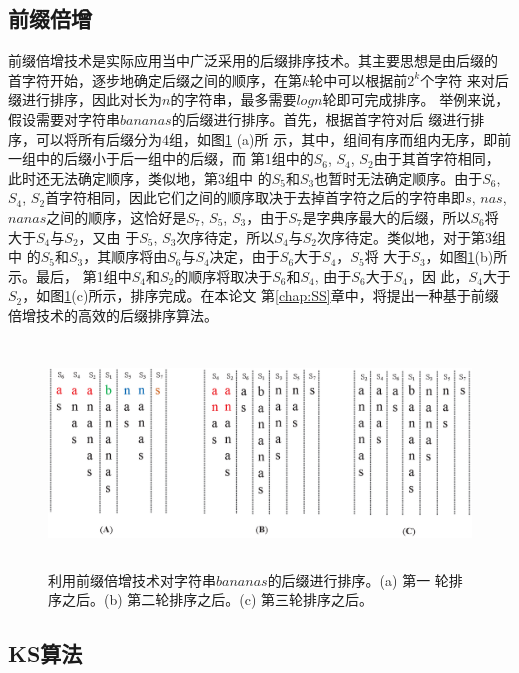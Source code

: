 \subsection{前缀倍增}

前缀倍增技术是实际应用当中广泛采用的后缀排序技术。其主要思想是由后缀的
首字符开始，逐步地确定后缀之间的顺序，在第$k$轮中可以根据前$2^k$个字符
来对后缀进行排序，因此对长为$n$的字符串，最多需要$logn$轮即可完成排序。
举例来说，假设需要对字符串$bananas$的后缀进行排序。首先，根据首字符对后
缀进行排序，可以将所有后缀分为4组，如图\ref{fig:Prefix_Doubling} (a)所
示，其中，组间有序而组内无序，即前一组中的后缀小于后一组中的后缀，而
第1组中的$S_6$, $S_4$,
$S_2$由于其首字符相同，此时还无法确定顺序，类似地，第3组中
的$S_5$和$S_3$也暂时无法确定顺序。由于$S_6$, $S_4$,
$S_2$首字符相同，因此它们之间的顺序取决于去掉首字符之后的字符串即$s$,
$nas$, $nanas$之间的顺序，这恰好是$S_7$, $S_5$,
$S_3$，由于$S_7$是字典序最大的后缀，所以$S_6$将大于$S_4$与$S_2$，又由
于$S_5$,
$S_3$次序待定，所以$S_4$与$S_2$次序待定。类似地，对于第3组中
的$S_5$和$S_3$，其顺序将由$S_6$与$S_4$决定，由于$S_6$大于$S_4$，$S_5$将
大于$S_3$，如图\ref{fig:Prefix_Doubling}(b)所示。最后，
第1组中$S_4$和$S_2$的顺序将取决于$S_6$和$S_4$, 由于$S_6$大于$S_4$，因
此，$S_4
$大于$S_2$，如图\ref{fig:Prefix_Doubling}(c)所示，排序完成。在本论文
第\ref{chap:SS}章中，将提出一种基于前缀倍增技术的高效的后缀排序算法。

\begin{figure}[H]
  \centering
  \includegraphics[height=6cm ,width=15cm]{figures/1_Introduction/Prefix_Doubling.eps}
  \caption{利用前缀倍增技术对字符串$bananas$的后缀进行排序。(a) 第一
    轮排序之后。(b) 第二轮排序之后。(c) 第三轮排序之后。}
  \label{fig:Prefix_Doubling}
\end{figure}

\subsection{KS算法}
\label{sec:KA}

